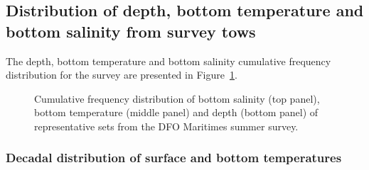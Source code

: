 \documentclass[12pt]{article}\usepackage[]{graphicx}\usepackage[]{color}
\begin{document}
\hypertarget{distribution-of-depth-bottom-temperature-and-bottom-salinity-from-survey-tows}{%
\subsection{Distribution of depth, bottom temperature and bottom salinity from survey tows}\label{distribution-of-depth-bottom-temperature-and-bottom-salinity-from-survey-tows}}

The depth, bottom temperature and bottom salinity cumulative frequency distribution for the survey are presented in Figure~\ref{fig:setsdist}.


\begin{figure}[htb]

{\centering {} 

}

\caption{Cumulative frequency distribution of bottom salinity (top panel), bottom temperature (middle panel) and depth (bottom panel) of representative sets from the DFO Maritimes summer survey.}\label{fig:setsdist}
\end{figure}
\hypertarget{decadal-distribution-of-surface-and-bottom-temperatures}{%
\subsubsection{Decadal distribution of surface and bottom temperatures}\label{decadal-distribution-of-surface-and-bottom-temperatures}}
\end{document}
